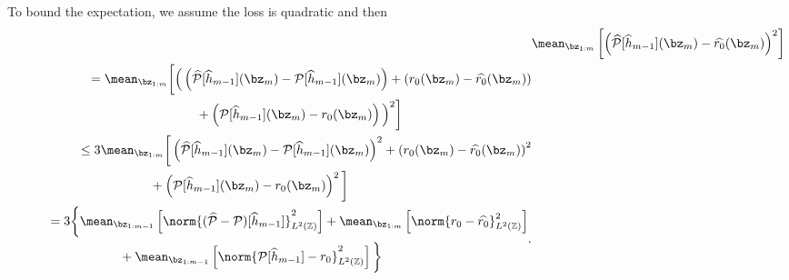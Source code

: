 To bound the expectation, we assume the loss is quadratic and then
\begin{align*}
    &\mean_{ \bz_{ 1:m } } \left[
        \left(
            \hat{ \meanop } [ \hat{ h }_{ m-1 } ] ( \bz_{ m } )
            - \hat{ r_{ 0 } } ( \bz_{ m } )
        \right)^2
    \right] \\
    \begin{split}
        &\hspace{1cm}
        = \mean_{ \bz_{ 1:m } } \bigg[
            \Big(
                \left(
                    \hat{ \meanop } [ \hat{ h }_{ m-1 } ] ( \bz_{ m } )
                    - \meanop [ \hat{ h }_{ m-1 } ] ( \bz_{ m } )
                \right)
                + \left(
                    r_{ 0 } ( \bz_{ m } )
                    - \hat{ r_{ 0 } } ( \bz_{ m } )
                \right) \\
        &\hspace{4cm}
                + \left(
                    \meanop [ \hat{ h }_{ m-1 } ] ( \bz_{ m } )
                    - r_{ 0 } ( \bz_{ m } )
                \right)
            \Big)^2
        \bigg]
    \end{split} \\
    \begin{split}
        &\hspace{1cm}
        \leq 3 \mean_{ \bz_{ 1:m } } \bigg[
            \left(
                \hat{ \meanop } [ \hat{ h }_{ m-1 } ] ( \bz_{ m } )
                - \meanop [ \hat{ h }_{ m-1 } ] ( \bz_{ m } )
            \right)^2
            + \left(
                r_{ 0 } ( \bz_{ m } )
                - \hat{ r_{ 0 } } ( \bz_{ m } )
            \right)^2 \\
    &\hspace{3cm}
            + \left(
                \meanop [ \hat{ h }_{ m-1 } ] ( \bz_{ m } )
                - r_{ 0 } ( \bz_{ m } )
            \right)^2
        \bigg]
    \end{split} \\
    \begin{split}
        &\hspace{1cm}
        = 3 \bigg\{
            \mean_{ \bz_{ 1:m-1 } }\left[
                \norm{
                ( \hat{ \meanop } - \meanop )
                [ \hat{ h }_{ m-1 } ]
            }_{ L^2 ( \mathbb{Z} ) }^2
            \right]
            + \mean_{ \bz_{ 1:m } } \left[
                \norm{ r_{ 0 } - \hat{ r_{ 0 } } }_{ L^2 ( \mathbb{Z} ) }^2
            \right]\\
        &\hspace{3cm}
            + \mean_{ \bz_{ 1:m-1 } }  \left[
                \norm{ \meanop [ \hat{ h }_{ m-1 } ] - r_{ 0 } }_{ L^2 ( \mathbb{Z} ) }^2
            \right]
        \bigg\}
    \end{split}
.\end{align*}
